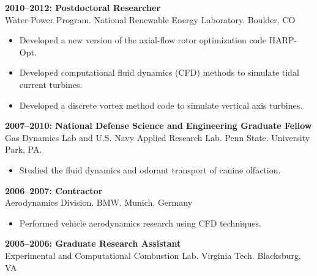 \vspace{-0.2in}
\textbf{2010--2012: Postdoctoral Researcher}\\
Water Power Program. National Renewable Energy Laboratory. Boulder, CO\\
\vspace{-0.35in}
\begin{itemize}
  \item Developed a new version of the axial-flow rotor optimization code HARP-Opt.
  \vspace{-0.1in}
  \item Developed computational fluid dynamics (CFD) methods to simulate tidal current turbines.
  \vspace{-0.1in}
  \item Developed a discrete vortex method code to simulate vertical axis turbines.
\end{itemize}
\vspace{-0.2in}
\textbf{2007--2010: National Defense Science and Engineering Graduate Fellow}\\
Gas Dynamics Lab and U.S. Navy Applied Research Lab. Penn State. University Park, PA. \\
\vspace{-0.35in}
\begin{itemize}
  \item Studied the fluid dynamics and odorant transport of canine olfaction.
\end{itemize}
\vspace{-0.2in}
\textbf{2006--2007:  Contractor}\\
Aerodynamics Division. BMW. Munich, Germany\\
\vspace{-0.35in}
\begin{itemize}
  \item Performed vehicle aerodynamics research using CFD techniques.
\end{itemize}
\vspace{-0.2in}
\textbf{2005--2006: Graduate Research Assistant}\\
Experimental and Computational Combustion Lab. Virginia Tech. Blacksburg, VA\\



